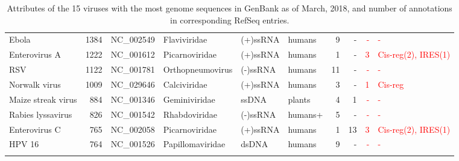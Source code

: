 \begin{table}
\begin{center}
\begin{tabular}{|l|r|l|l|l|l||r|r||r|l||}
  Ebola              &        1384  & NC\_002549      & Flaviviridae   & (+)ssRNA & humans &     9 & -      & \textcolor{red}{-}        & \textcolor{red}{-} \\ 
  Enterovirus A      &        1222  & NC\_001612      & Picarnoviridae & (+)ssRNA & humans &     1 & -      & \textcolor{red}{3}        & \textcolor{red}{Cis-reg(2), IRES(1)} \\
  RSV                &        1122  & NC\_001781      &Orthopneumovirus& (-)ssRNA & humans &    11 & -      & \textcolor{red}{-}        & \textcolor{red}{-} \\
  Norwalk virus      &        1009  & NC\_029646      & Calciviridae   & (+)ssRNA & humans &     3 & -      & \textcolor{red}{1}        & \textcolor{red}{Cis-reg} \\ 
  Maize streak virus &         884  & NC\_001346      & Geminiviridae  & ssDNA    & plants &     4 & 1      & \textcolor{red}{-}        & \textcolor{red}{-}  \\
  Rabies lyssavirus  &         826  & NC\_001542      & Rhabdoviridae  & (-)ssRNA & humans+&     5 & -      & \textcolor{red}{-}        & \textcolor{red}{-}  \\
  Enterovirus C      &         765  & NC\_002058      & Picarnoviridae & (+)ssRNA & humans &     1 & 13     & \textcolor{red}{3}        & \textcolor{red}{Cis-reg(2), IRES(1)} \\
  HPV 16             &         764  & NC\_001526      &Papillomaviridae& dsDNA    & humans &     9 & -      & \textcolor{red}{-}        & \textcolor{red}{-} \\ \hline
\multicolumn{10}{c}{} \\
\end{tabular}
\caption{Attributes of the 15 viruses with the most genome sequences in GenBank as of March, 2018, and number of annotations in corresponding RefSeq entries.}
\label{tbl}
\end{center}
\end{table}

